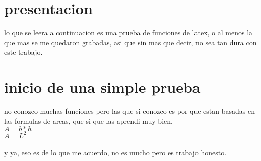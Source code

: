 \documentclass[11pt]{book}
\begin{document}
\chapter{presentacion}

lo que se leera a continuacion es una prueba de funciones de latex, o al menos la que mas se me quedaron grabadas, asi que sin mas que decir, no sea tan dura con este trabajo.

\chapter{inicio de una simple prueba}

no conozco muchas funciones pero las que si conozco es por que estan basadas en las formulas de areas, que si que las aprendi muy bien,\\ 
$A=b*h$\\
$A=L^2$\\
\\
y ya, eso es de lo que me acuerdo, no es mucho pero es trabajo honesto.
\end{document}
